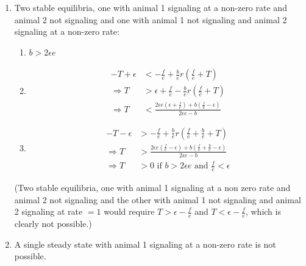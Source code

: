 \documentclass{article}
\begin{document}
\begin{enumerate}
\item Two stable equilibria, one with animal 1 signaling at a non-zero rate and animal 2 not signaling and one with animal 1 not signaling and animal 2 signaling at a non-zero rate:
\begin{enumerate}
\item $b>2\epsilon e$
\item 
\begin{align*}
-T+\epsilon&<-\frac{f}{e}+\frac{b}{e}r\left(\frac{f}{e}+T\right)
\\ \Rightarrow T&>\epsilon+\frac{f}{e}-\frac{b}{e}r\left(\frac{f}{e}+T\right)
\\ \Rightarrow T&<\frac{ 2\epsilon e(\epsilon+\frac{f}{e})+b(\frac{f}{e}-\epsilon)}{2\epsilon e-b}\end{align*}
\item 
\begin{align*}
-T-\epsilon&>-\frac{f}{e}+\frac{b}{e}r\left(\frac{f}{e}+\frac{b}{e}+T\right)
\\ \Rightarrow T&>\frac{2\epsilon e(\frac{f}{e}-\epsilon)+b(\frac{f}{e}+\frac{b}{e}-\epsilon)}{2\epsilon e-b}
\\ \Rightarrow T&>0 \text{ if } b>2\epsilon e \text{ and } \frac{f}{e}<\epsilon 
\end{align*}
\end{enumerate}
(Two stable equilibria, one with animal 1 signaling at a non zero rate and animal 2 not signaling and the other with animal 1 not signaling and animal 2 signaling at rate $=1$ would require $T>\epsilon-\frac{f}{e}$ and $T<\epsilon-\frac{f}{e}$, which is clearly not possible.)
\item A single steady state with animal 1 signaling at a non-zero rate is not possible.
\end{enumerate}
\end{document}
